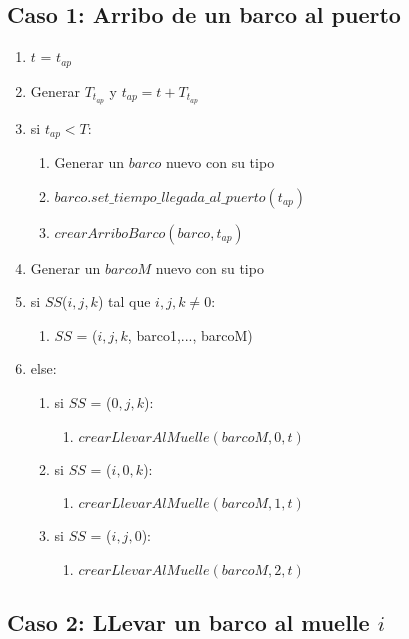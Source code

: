 \documentclass[a4paper,10pt]{article}
\begin{document}
\subsection*{Caso 1: Arribo de un barco al puerto}
\begin{enumerate}
  \item $t$ = $t_{ap}$
  \item Generar $T_{t_{ap}}$ y $t_{ap} = t + T_{t_{ap}}$
  \item si $t_{ap} < T$:
  \begin{enumerate}
  	 \item Generar un $barco$ nuevo con su tipo
  	 \item $barco.set\_tiempo\_llegada\_al\_puerto(t_{ap})$
  	 \item $crearArriboBarco(barco, t_{ap})$
  \end{enumerate}
 
  \item Generar un $barcoM$ nuevo con su tipo
  \item si $SS$($i,j,k$) tal que $i, j, k \neq 0$:
  \begin{enumerate}
    \item $SS$ = ($i,j,k$, barco1,..., barcoM)
  \end{enumerate}
  \item else:
  \begin{enumerate}
    \item si $SS$ = ($0,j,k$):
    \begin{enumerate}
      \item $crearLlevarAlMuelle(barcoM, 0, t)$
      
    \end{enumerate}
    \item si $SS$ = ($i,0,k$):
    \begin{enumerate}
      \item $crearLlevarAlMuelle(barcoM, 1, t)$
      
    \end{enumerate}
    \item si $SS$ = ($i,j,0$):
    \begin{enumerate}
     \item $crearLlevarAlMuelle(barcoM, 2, t)$
    \end{enumerate}
  \end{enumerate}
\end{enumerate}

\subsection*{Caso 2: LLevar un barco al muelle $i$}
\end{document}
